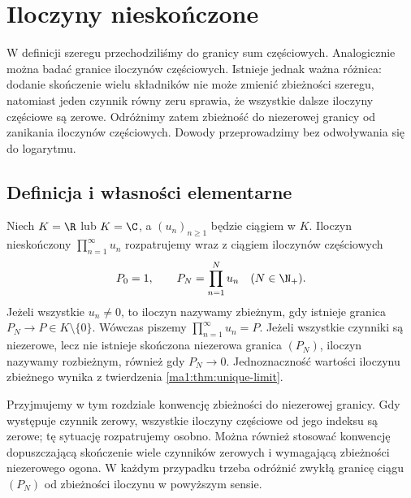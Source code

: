 \chapter{Iloczyny nieskończone}
\label{ma1:ch:infinite-products}

W definicji szeregu przechodziliśmy do granicy sum częściowych. Analogicznie można badać granice iloczynów częściowych. Istnieje jednak ważna różnica: dodanie skończenie wielu składników nie może zmienić zbieżności szeregu, natomiast jeden czynnik równy zeru sprawia, że wszystkie dalsze iloczyny częściowe są zerowe. Odróżnimy zatem zbieżność do niezerowej granicy od zanikania iloczynów częściowych. Dowody przeprowadzimy bez odwoływania się do logarytmu.

\section{Definicja i własności elementarne}
\begin{definicja}
\label{ma1:def:infinite-product}
Niech $K=\R$ lub $K=\C$, a $(u_n)_{n\ge1}$ będzie ciągiem w $K$. Iloczyn nieskończony $\prod_{n=1}^\infty u_n$ rozpatrujemy wraz z ciągiem iloczynów częściowych
\[
 P_0=1,\qquad P_N=\prod_{n=1}^N u_n\quad(N\in\N_+).
\]
Jeżeli wszystkie $u_n\ne0$, to iloczyn nazywamy zbieżnym, gdy istnieje granica $P_N\to P\in K\setminus\{0\}$. Wówczas piszemy $\prod_{n=1}^\infty u_n=P$. Jeżeli wszystkie czynniki są niezerowe, lecz nie istnieje skończona niezerowa granica $(P_N)$, iloczyn nazywamy rozbieżnym, również gdy $P_N\to0$. Jednoznaczność wartości iloczynu zbieżnego wynika z twierdzenia \ref{ma1:thm:unique-limit}.
\end{definicja}
Przyjmujemy w tym rozdziale konwencję zbieżności do niezerowej granicy. Gdy występuje czynnik zerowy, wszystkie iloczyny częściowe od jego indeksu są zerowe; tę sytuację rozpatrujemy osobno. Można również stosować konwencję dopuszczającą skończenie wiele czynników zerowych i wymagającą zbieżności niezerowego ogona. W każdym przypadku trzeba odróżnić zwykłą granicę ciągu $(P_N)$ od zbieżności iloczynu w powyższym sensie.


